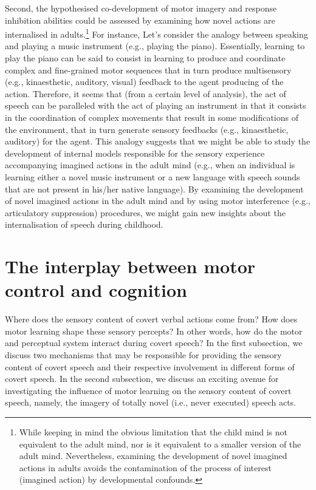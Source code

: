 \documentclass[utf8]{template/frontiersSCNS} %
\begin{document}

Second, the hypothesised co-development of motor imagery and response inhibition abilities could be assessed by examining how novel actions are internalised in adults.\footnote{While keeping in mind the obvious limitation that the child mind is not equivalent to the adult mind, nor is it equivalent to a smaller version of the adult mind. Nevertheless, examining the development of novel imagined actions in adults avoids the contamination of the process of interest (imagined action) by developmental confounds.} For instance, Let’s consider the analogy between speaking and playing a music instrument (e.g., playing the piano). Essentially, learning to play the piano can be said to consist in learning to produce and coordinate complex and fine-grained motor sequences that in turn produce multisensory (e.g., kinaesthetic, auditory, visual) feedback to the agent producing of the action. Therefore, it seems that (from a certain level of analysis), the act of speech can be paralleled with the act of playing an instrument in that it consists in the coordination of complex movements that result in some modifications of the environment, that in turn generate sensory feedbacks (e.g., kinaesthetic, auditory) for the agent. This analogy suggests that we might be able to study the development of internal models responsible for the sensory experience accompanying imagined actions in the adult mind (e.g., when an individual is learning either a novel music instrument or a new language with speech sounds that are not present in his/her native language). By examining the development of novel imagined actions in the adult mind and by using motor interference (e.g., articulatory suppression) procedures, we might gain new insights about the internalisation of speech during childhood.

\section{The interplay between motor control and cognition}

Where does the sensory content of covert verbal actions come from? How does motor learning shape these sensory percepts? In other words, how do the motor and perceptual system interact during covert speech? In the first subsection, we discuss two mechanisms that may be responsible for providing the sensory content of covert speech and their respective involvement in different forms of covert speech. In the second subsection, we discuss an exciting avenue for investigating the influence of motor learning on the sensory content of covert speech, namely, the imagery of totally novel (i.e., never executed) speech acts.
\end{document}
